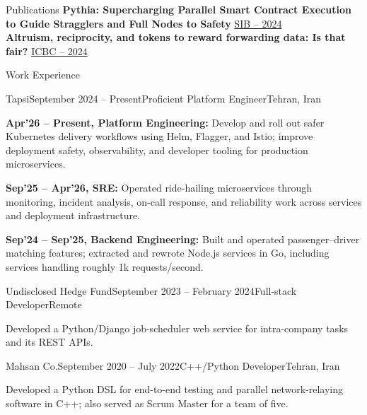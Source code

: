 \documentclass[11pt]{resume}
\begin{document}
\begin{rSection}{Publications}
  \vspace{4pt}
  \textbf{Pythia: Supercharging Parallel Smart Contract Execution to Guide Stragglers and Full Nodes to Safety} \hfill \href{https://arxiv.org/abs/2401.14278}{SIB -- 2024}\\
  \textbf{Altruism, reciprocity, and tokens to reward forwarding data: Is that fair?} \hfill \href{https://arxiv.org/abs/2307.02231}{ICBC -- 2024}
\end{rSection}

\begin{rSection}{Work Experience}
  \vspace{4pt}
  \begin{rSubsection}{Tapsi}{September 2024 -- Present}{Proficient Platform Engineer}{Tehran, Iran}
    \item \textbf{Apr'26 -- Present, Platform Engineering:} Develop and roll out safer Kubernetes delivery workflows using Helm, Flagger, and Istio; improve deployment safety, observability, and developer tooling for production microservices.
    \item \textbf{Sep'25 -- Apr'26, SRE:} Operated ride-hailing microservices through monitoring, incident analysis, on-call response, and reliability work across services and deployment infrastructure.
    \item \textbf{Sep'24 -- Sep'25, Backend Engineering:} Built and operated passenger--driver matching features; extracted and rewrote Node.js services in Go, including services handling roughly 1k requests/second.
  \end{rSubsection}
  \begin{rSubsection}{Undisclosed Hedge Fund}{September 2023 -- February 2024}{Full-stack Developer}{Remote}
    \item Developed a Python/Django job-scheduler web service for intra-company tasks and its REST APIs.
  \end{rSubsection}
  \begin{rSubsection}{Mahsan Co.}{September 2020 -- July 2022}{C++/Python Developer}{Tehran, Iran}
    \item Developed a Python DSL for end-to-end testing and parallel network-relaying software in C++; also served as Scrum Master for a team of five.
  \end{rSubsection}
\end{rSection}
\end{document}
